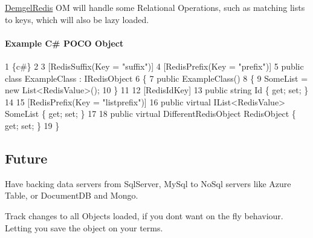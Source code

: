 \hyperlink{namespace_demgel_redis}{Demgel\+Redis} O\+M will handle some {\ttfamily Relational Operations}, such as matching lists to keys, which will also be lazy loaded.

\paragraph*{Example C\# P\+O\+C\+O Object}


\begin{DoxyCode}
1 \{c#\}
2 
3 [RedisSuffix(Key = "suffix")]
4 [RedisPrefix(Key = "prefix")]
5 public class ExampleClass : IRedisObject
6 \{
7     public ExampleClass()
8     \{
9         SomeList = new List<RedisValue>();
10     \}
11 
12     [RedisIdKey]
13     public string Id \{ get; set; \}
14 
15     [RedisPrefix(Key = "listprefix")]
16     public virtual IList<RedisValue> SomeList \{ get; set; \}
17 
18     public virtual DifferentRedisObject RedisObject \{ get; set; \}
19 \}
\end{DoxyCode}


\subsection*{Future}


\begin{DoxyItemize}
\item Have backing data servers from Sql\+Server, My\+Sql to No\+Sql servers like Azure Table, or Document\+D\+B and Mongo.
\item Track changes to all Objects loaded, if you don\textquotesingle{}t want {\ttfamily on the fly} behaviour. Letting you save the object on your terms. 
\end{DoxyItemize}